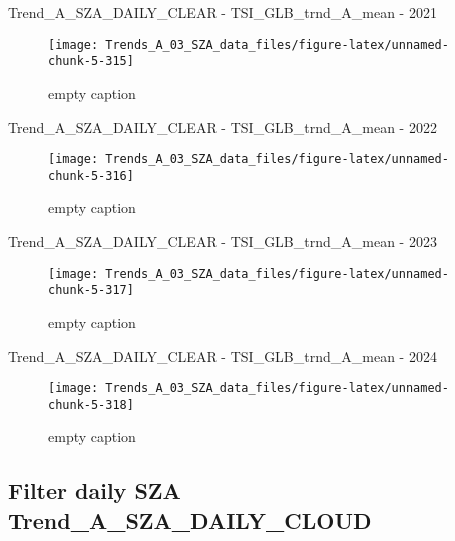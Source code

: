 \documentclass[
  10pt,
  a4paper,oneside]{article}
\begin{document}
Trend\_A\_SZA\_DAILY\_CLEAR - TSI\_GLB\_trnd\_A\_mean - 2021

\begin{figure}[!ht]

{\centering \texttt{[image: Trends\_A\_03\_SZA\_data\_files/figure-latex/unnamed-chunk-5-315]} 

}

\caption{ empty caption }\label{fig:unnamed-chunk-5-315}
\end{figure}

Trend\_A\_SZA\_DAILY\_CLEAR - TSI\_GLB\_trnd\_A\_mean - 2022

\begin{figure}[!ht]

{\centering \texttt{[image: Trends\_A\_03\_SZA\_data\_files/figure-latex/unnamed-chunk-5-316]} 

}

\caption{ empty caption }\label{fig:unnamed-chunk-5-316}
\end{figure}

Trend\_A\_SZA\_DAILY\_CLEAR - TSI\_GLB\_trnd\_A\_mean - 2023

\begin{figure}[!ht]

{\centering \texttt{[image: Trends\_A\_03\_SZA\_data\_files/figure-latex/unnamed-chunk-5-317]} 

}

\caption{ empty caption }\label{fig:unnamed-chunk-5-317}
\end{figure}

Trend\_A\_SZA\_DAILY\_CLEAR - TSI\_GLB\_trnd\_A\_mean - 2024

\begin{figure}[!ht]

{\centering \texttt{[image: Trends\_A\_03\_SZA\_data\_files/figure-latex/unnamed-chunk-5-318]} 

}

\caption{ empty caption }\label{fig:unnamed-chunk-5-318}
\end{figure}

\FloatBarrier

\hypertarget{filter-daily-sza-trend_a_sza_daily_cloud}{%
\subsection{Filter daily SZA Trend\_A\_SZA\_DAILY\_CLOUD}\label{filter-daily-sza-trend_a_sza_daily_cloud}}
\end{document}
